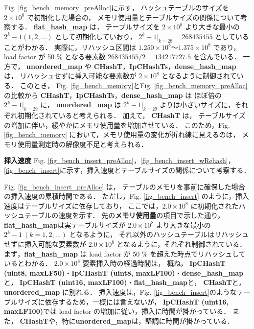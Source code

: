 Fig. \ref{fig_bench_memory_preAlloc}に示す，
ハッシュテーブルのサイズを $2\times10^8$ で初期化した場合の，
メモリ使用量とテーブルサイズの関係について考察する．
{\bf flat\_hash\_map} は，
テーブルサイズを $2\times10^8$ より大きな最小の $2^k-1 (1,2,...)$ として初期化していおり，
$2^k-1|_{k=28} = 268435455$ としていることがわかる．
実際に，リハッシュ区間は $1.250\times10^8〜1.375\times10^8$ であり，
load factor が 50 \% となる要素数 $268435455/2=134217727.5$ を含んでいる．
一方で，
{\bf unordered\_map} や {\bf CHashT}，{\bf IpCHashTs}，{\bf dense\_hash\_map} は，
リハッシュせずに挿入可能な要素数が $2\times10^8$ となるように制御されている．
このとき，
Fig. \ref{fig_bench_memory}とFig. \ref{fig_bench_memory_preAlloc}の比較から
{\bf CHashT}，{\bf IpCHashTs}，{\bf dense\_hash\_map} は
ほぼ倍の $2^k-1|_{k=29}$ に，
{\bf unordered\_map} は  $2^k-1|_{k=29}$ よりは小さいサイズに，それぞれ初期化されていると考えられる．
加えて，
{\bf CHashT} は，
テーブルサイズの増加に伴い，緩やかにメモリ使用量を増加させている．
このため，Fig. \ref{fig_bench_memory} において，メモリ使用量の変化が折れ線に見えるのは，
メモリ使用量測定時の解像度不足と考えられる．
\leavevmode \newline

%
{\bf 挿入速度}
\samepage\newline\indent
Fig. \ref{fig_bench_insert_preAlloc}，\ref{fig_bench_insert_wRehash}，\ref{fig_bench_insert}に示す，挿入速度とテーブルサイズの関係について考察する．

Fig. \ref{fig_bench_insert_preAlloc} は，
テーブルのメモリを事前に確保した場合の挿入速度の累積時間である．
ただし，Fig. \ref{fig_bench_insert} のように，挿入速度はテーブルサイズに依存しており，
ここでは，$2.0\times10^8$ に初期化されたハッシュテーブルの速度を示す．
先の{\bf メモリ使用量}の項目で示した通り，
{\bf flat\_hash\_map}は実テーブルサイズが $2.0\times10^8$ より大きな最小の $2^k-1\ (k=1,2,...)$ となるように，
それ以外のハッシュテーブルはリハッシュせずに挿入可能な要素数が $2.0\times10^8$ となるように，それぞれ制御されている．
まず，{\bf flat\_hash\_map} は load factor が 50 \% を超えた時点でリハッシュしているとわかる．
$2.0\times10^8$ 要素挿入時の経過時間は，
概ね，
{\bf IpCHashT (uint8, maxLF50)}・{\bf IpCHashT (uint8, maxLF100)}・{\bf dense\_hash\_map}と，
{\bf IpCHashT (uint16, maxLF100)}・{\bf flat\_hash\_map}と，
{\bf CHashT}と，
{\bf unordered\_map} に別れる．
挿入速度は，Fig. \ref{fig_bench_insert}のようなテーブルサイズに依存するため，一概には言えないが，
{\bf IpCHashT (uint16, maxLF100)}では load factor の増加に従い，挿入に時間が掛かっている．
また，
{\bf CHashT}や，特に{\bf unordered\_map}は，堅調に時間が掛かっている．

